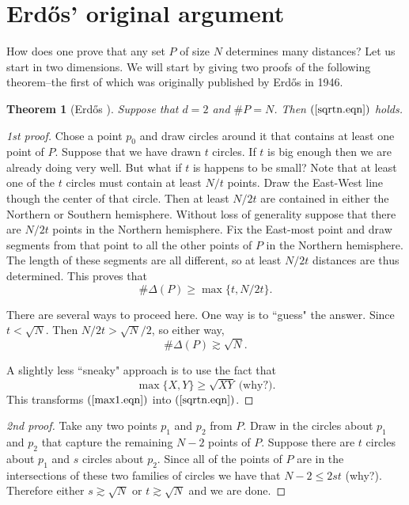 \documentclass[]{stml-l}
\numberwithin{equation}{chapter}
\theoremstyle{plain}
\newtheorem{theorem}[equation]{Theorem}
\theoremstyle{definition}
\theoremstyle{remark}
\begin{document}
\section{Erd\H{o}s' original argument}

How does one prove that any set $P$ of size $N$ determines many
distances? Let us start in two dimensions.   We will start by giving two proofs of the following theorem--the first of which was originally published by Erd\H{o}s in 1946.  

\begin{theorem}[Erd\H{o}s \cite{Erd}] \label{erdos.thm}
Suppose that $d=2$ and $\# P=N$. Then
$(\ref{sqrtn.eqn})$ holds. 
\end{theorem}

\begin{proof}[1st proof]
Chose a point $p_0$ and draw circles around it that contains at least one point of $P$.
Suppose that we have drawn $t$ circles. If $t$ is big enough then
we are already doing very well. But what if $t$ is happens to be
small? Note that at least one of the $t$ circles must contain at
least $N/t$ points. Draw the East-West line though the center of
that circle. Then at least $N/2t$ are contained in either the
Northern or Southern hemisphere. Without loss of generality
suppose that there are $N/2t$ points in the Northern hemisphere.
Fix the East-most point and draw segments from that point to all
the other points of $P$ in the Northern hemisphere. The length of
these segments are all different, so at least $N/2t$ distances are
thus determined. This proves that
\begin{equation} \label{max1.eqn}
\# \Delta(P) \ge \max \{t, N/2t\}.
\end{equation}

There are several ways to proceed here. One way is to ``guess" the
answer. Since $t<\sqrt{N}$. Then $N/2t>\sqrt{N}/2$, so
either way,
\begin{equation} \label{sqrtn.eqn}
\# \Delta(P) \gtrsim \sqrt{N}.
\end{equation}


A slightly less ``sneaky" approach is to use the fact that
\begin{equation}
\max \{X,Y\} \ge \sqrt{XY} \  \text{(why?)}.
\end{equation}
This transforms $(\ref{max1.eqn})$ into $(\ref{sqrtn.eqn})$. 
\end{proof}


\begin{proof}[2nd proof]
Take any two points $p_1$ and $p_2$ from $P$.  Draw in the circles about $p_1$ and $p_2$ that capture the remaining $N-2$ points of $P$. Suppose there are $t$ circles about $p_1$ and $s$ circles about $p_2$.  Since all of the points of $P$ are in the intersections of these two families of circles we have that $N-2 \leq 2st$ (why?).   Therefore either $s \gtrsim \sqrt{N}$ or $t \gtrsim \sqrt{N}$ and we are done.
\end{proof}
\end{document}
